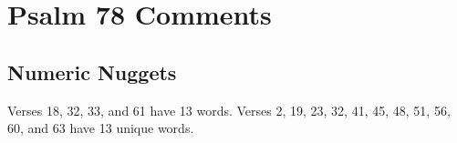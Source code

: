 \section{Psalm 78 Comments}

\subsection{Numeric Nuggets}
Verses 18, 32, 33, and 61 have 13 words.  Verses  2, 19, 23, 32, 41, 45, 48, 51, 56, 60, and 63 have 13 unique words.



